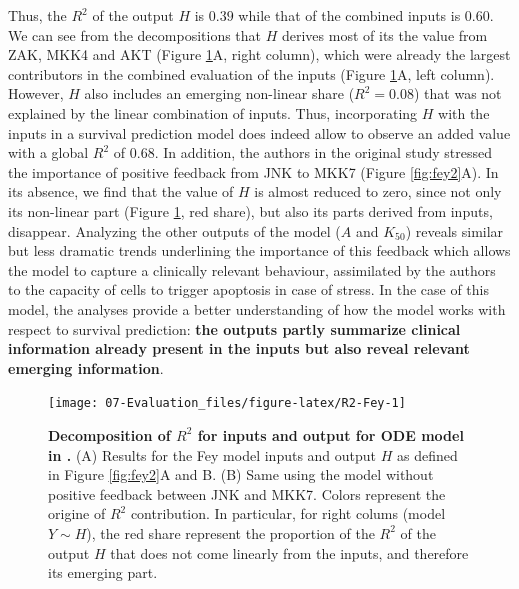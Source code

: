\documentclass[a4paper,12pt,twoside,onecolumn,openright,final,oldfontcommands]{memoir}
\begin{document}
Thus, the \(R^2\) of the output \(H\) is \(0.39\) while that of the
combined inputs is \(0.60\). We can see from the decompositions that
\(H\) derives most of its the value from ZAK, MKK4 and AKT (Figure
\ref{fig:R2-Fey}A, right column), which were already the largest
contributors in the combined evaluation of the inputs (Figure
\ref{fig:R2-Fey}A, left column). However, \(H\) also includes an
emerging non-linear share (\(R^2=0.08\)) that was not explained by the
linear combination of inputs. Thus, incorporating \(H\) with the inputs
in a survival prediction model does indeed allow to observe an added
value with a global \(R^2\) of \(0.68\). In addition, the authors in the
original study stressed the importance of positive feedback from JNK to
MKK7 (Figure \ref{fig:fey2}A). In its absence, we find that the value of
\(H\) is almost reduced to zero, since not only its non-linear part
(Figure \ref{fig:R2-Fey}, red share), but also its parts derived from
inputs, disappear. Analyzing the other outputs of the model (\(A\) and
\(K_{50}\)) reveals similar but less dramatic trends underlining the
importance of this feedback which allows the model to capture a
clinically relevant behaviour, assimilated by the authors to the
capacity of cells to trigger apoptosis in case of stress. In the case of
this model, the analyses provide a better understanding of how the model
works with respect to survival prediction: \textbf{the outputs partly
summarize clinical information already present in the inputs but also
reveal relevant emerging information}.

\begin{figure}

{\centering \texttt{[image: 07-Evaluation\_files/figure-latex/R2-Fey-1]} 

}

\caption[Decomposition of $R^2$ for inputs and output for ODE model in Fey \emph{et al}.]{\textbf{Decomposition of \(R^2\) for inputs and
output for ODE model in \citet{fey2015signaling}.} (A) Results for the
Fey model inputs and output \(H\) as defined in Figure \ref{fig:fey2}A
and B. (B) Same using the model without positive feedback between JNK
and MKK7. Colors represent the origine of \(R^2\) contribution. In
particular, for right colums (model\(Y\sim H\)), the red share represent
the proportion of the \(R^2\) of the output \(H\) that does not come
linearly from the inputs, and therefore its emerging part.}\label{fig:R2-Fey}
\end{figure}
\end{document}
